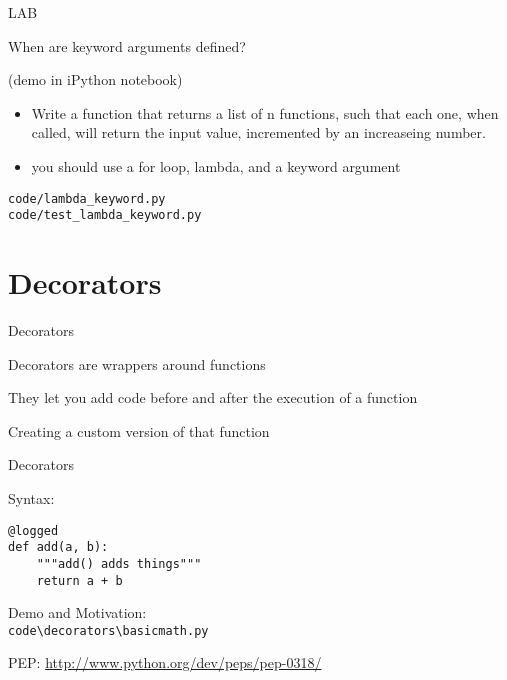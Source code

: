 \documentclass{beamer}
\begin{document}
\begin{frame}[fragile]{LAB}

{\Large When are keyword arguments defined?}

\vfill
{\large (demo in iPython notebook)}

\vfill
\begin{itemize}
  \item Write a function that returns a list of n functions,
such that each one, when called, will return the input value,
incremented by an increaseing number.

  \item you should use a for loop, lambda, and a keyword argument
\end{itemize}

\vfill
\verb|code/lambda_keyword.py| \\
\verb|code/test_lambda_keyword.py| \\

\end{frame}


\section{Decorators}

\begin{frame}[fragile]{Decorators}

{\LARGE Decorators are wrappers around functions}

\vfill
{\LARGE They let you add code before and after the execution of a function}

\vfill
{\LARGE Creating a custom version of that function}

\end{frame} 

\begin{frame}[fragile]{Decorators}

{\LARGE Syntax:}

\vfill
\begin{verbatim}
@logged
def add(a, b):
    """add() adds things"""
    return a + b
\end{verbatim}

\vfill
{\Large Demo and Motivation: \\
 \verb|code\decorators\basicmath.py| }

\vfill
PEP: \url{http://www.python.org/dev/peps/pep-0318/}

\end{frame} 
\end{document}
